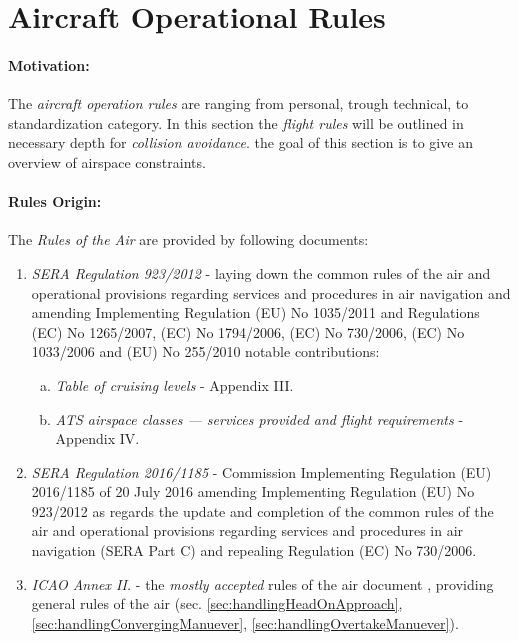 \section{Aircraft Operational Rules}\label{sec:AircraftOperationRules}
\paragraph{Motivation:} The \emph{aircraft operation rules} are ranging from personal, trough technical, to standardization category. In this section the \emph{flight rules} will be outlined in necessary depth for \emph{collision avoidance}. the goal of this section is to give an overview of airspace constraints. 

\paragraph{Rules Origin:} The \emph{Rules of the Air} are provided by following documents:

\begin{enumerate}
    \item \emph{SERA Regulation 923/2012} - laying down the common rules of the air and operational provisions regarding services and procedures in air navigation and amending Implementing Regulation (EU) No 1035/2011 and Regulations (EC) No 1265/2007, (EC) No 1794/2006, (EC) No 730/2006, (EC) No 1033/2006 and (EU) No 255/2010 \cite{rulesOfTheFlight2012} notable contributions:
    \begin{enumerate}[a.]
        \item \emph{Table of cruising levels} - Appendix III.
        \item \emph{ATS airspace classes — services provided and flight requirements} - Appendix IV.
    \end{enumerate}
    
    \item \emph{SERA Regulation 2016/1185} - Commission Implementing Regulation (EU) 2016/1185 of 20 July 2016 amending Implementing Regulation (EU) No 923/2012 as regards the update and completion of the common rules of the air and operational provisions regarding services and procedures in air navigation (SERA Part C) and repealing Regulation (EC) No 730/2006.

    \item \emph{ICAO  Annex II.} - the \emph{mostly accepted} rules of the air document \cite{icaoAnnex2}, providing general rules of the air (sec. \ref{sec:handlingHeadOnApproach}, \ref{sec:handlingConvergingManuever}, \ref{sec:handlingOvertakeManuever}).
\end{enumerate}

